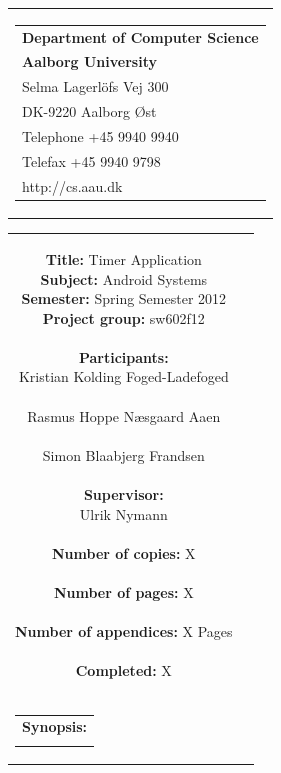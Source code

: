 \begin{nopagebreak}
\samepage 
\begin{tabular}{r}
\parbox{\textwidth}{
\hfill \parbox{6.2cm}{\begin{tabular}{l}
{\textsf\small \textbf{Department of Computer Science }}\\
{\textsf\small  \textbf{Aalborg University}}\\
{\textsf\small Selma Lagerlöfs Vej 300}\\
{\textsf\small DK-9220 Aalborg Øst}\\
{\textsf\small Telephone +45 9940 9940}\\
{\textsf\small Telefax +45 9940 9798}\\
{\textsf\small http://cs.aau.dk}
\end{tabular}}}
\end{tabular}

\begin{tabular}{cc}
\parbox{7cm}{
\textbf{Title:} 
Timer Application\\
\textbf{Subject:} 
Android Systems\\
\textbf{Semester:} Spring Semester 2012\\
\textbf{Project group:} sw602f12\\ \\
\textbf{Participants:} \\
Kristian Kolding Foged-Ladefoged \\ \\
Rasmus Hoppe Næsgaard Aaen \\ \\
Simon Blaabjerg Frandsen \\ \\
\textbf{Supervisor:} \\
Ulrik Nymann\\ \\
\textbf{Number of copies:}
X \\ \\
\textbf{Number of pages:}
X \\ \\
\textbf{Number of appendices:}
X Pages\\ \\
\textbf{Completed:}
X \\ \\
}

\parbox{7cm}{
\vspace{.15cm}
\hfill 
\begin{tabular}{l}
\textbf{Synopsis:} \\
\fbox{
\parbox{6.5cm}{
{\vfill{\small {}\bigskip}}
}}
\end{tabular}}
\end{tabular}


\end{nopagebreak}